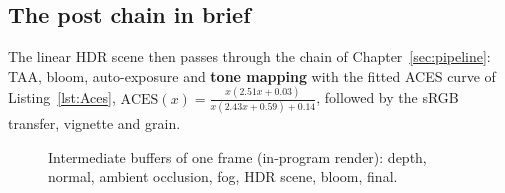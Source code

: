 \subsection{The post chain in brief}
The linear HDR scene then passes through the chain of Chapter~\ref{sec:pipeline}: TAA, bloom, auto-exposure and \textbf{tone mapping} with the fitted ACES curve of Listing~\ref{lst:Aces}, $\mathrm{ACES}(x)=\frac{x(2.51x+0.03)}{x(2.43x+0.59)+0.14}$, followed by the sRGB transfer, vignette and grain.
\lstAces
\begin{figure}[h]
\centering
{}
\caption{Intermediate buffers of one frame (in-program render): depth, normal, ambient occlusion, fog, HDR scene, bloom, final.}
\end{figure}
